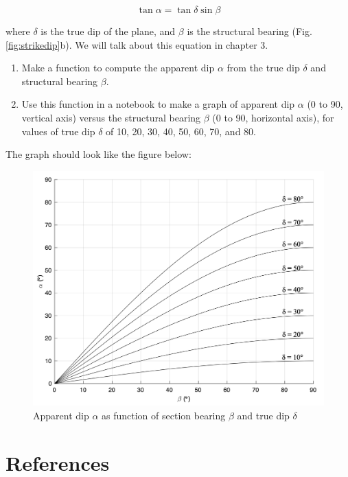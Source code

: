 \documentclass[a4paper , 12pt]{book}
\begin{document}
\begin{enumerate}
    \begin{equation}
        \tan\alpha=\tan\delta\sin\beta
    \end{equation}
    
    where $\delta$ is the true dip of the plane, and $\beta$ is the structural bearing (Fig. \ref{fig:strikedip}b). We will talk about this equation in chapter 3. 
    
    \begin {enumerate}
    \item Make a function to compute the apparent dip $\alpha$ from the true dip $\delta$ and structural bearing $\beta$. 
    \item Use this function in a notebook to make a graph of apparent dip $\alpha$ (0 to 90\degree, vertical axis) versus the structural bearing $\beta$ (0 to 90\degree, horizontal axis), for values of true dip $\delta$ of 10, 20, 30, 40, 50, 60, 70, and 80\degree. 
    \end{enumerate}
    
    The graph should look like the figure below:
    
    \begin{figure}[ht]
        \centering
        \includegraphics[width=12cm]{Figures/ch1f3.png}
        \caption{Apparent dip $\alpha$ as function of section bearing $\beta$ and true dip $\delta$}
        \label{fig:apparentdip}
    \end{figure}
\end{enumerate}

\section*{References}
\end{document}
